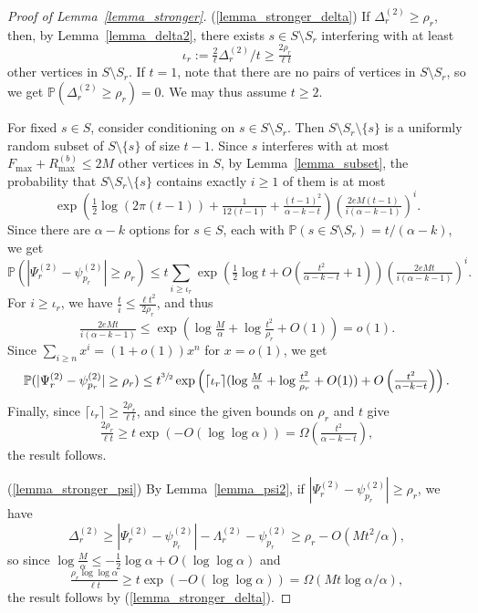 \documentclass{article}
\theoremstyle{plain}
\theoremstyle{remark}
\theoremstyle{plain}
\numberwithin{equation}{section}
\begin{document}
	\begin{proof}[Proof of Lemma~\ref{lemma_stronger}]
		(\ref{lemma_stronger_delta}) If $\Delta_r^{(2)}\geq\rho_r$, then, by Lemma~\ref{lemma_delta2}, there exists $s\in S\setminus S_r$ interfering with at least $$\iota_r:=\tfrac{2}{\ell}\Delta_r^{(2)}/t\geq\tfrac{2\rho_r}{\ell t}$$ other vertices in $S\setminus S_r$. If $t=1$, note that there are no pairs of vertices in $S\setminus S_r$, so we get $\mathbb{P}(\Delta_r^{(2)}\geq\rho_r)=0$. We may thus assume $t\geq2$.
		
		For fixed $s\in S$, consider conditioning on $s\in S\setminus S_r$. Then $S\setminus S_r\setminus\{s\}$ is a uniformly random subset of $S\setminus\{s\}$ of size $t-1$. Since $s$ interferes with at most $F_{\max}+R_{\max}^{(b)}\leq2M$ other vertices in $S$, by Lemma~\ref{lemma_subset}, the probability that $S\setminus S_r\setminus\{s\}$ contains exactly $i\geq1$ of them is at most $$\exp\left(\tfrac12\log(2\pi(t-1))+\tfrac1{12(t-1)}+\tfrac{(t-1)^2}{\alpha-k-t}\right)\left(\tfrac{2eM(t-1)}{i(\alpha-k-1)}\right)^i.$$ Since there are $\alpha-k$ options for $s\in S$, each with $\mathbb{P}(s\in S\setminus S_r)=t/(\alpha-k)$, we get $$\mathbb{P}(|\Psi_r^{(2)}-\psi_{p_r}^{(2)}|\geq\rho_r)\leq t\sum_{i\geq\iota_r}\exp\left(\tfrac12\log t+O\left(\tfrac{t^2}{\alpha-k-t}+1\right)\right)\left(\tfrac{2eMt}{i(\alpha-k-1)}\right)^i.$$ For $i\geq\iota_r$, we have $\tfrac{t}{i}\leq\tfrac{\ell t^2}{2\rho_r}$, and thus $$\tfrac{2eMt}{i(\alpha-k-1)}\leq\exp\left(\log\tfrac{M}{\alpha}+\log\tfrac{t^2}{\rho_r}+O(1)\right)=o(1).$$ Since $\sum_{i\geq n}x^i=(1+o(1))x^n$ for $x=o(1)$, we get $$\mathbb{P}(|\Psi_r^{(2)}-\psi_{p_r}^{(2)}|\geq\rho_r)\leq t^{\sfrac32}\exp\left(\lceil\iota_r\rceil(\log\tfrac{M}{\alpha}+\log\tfrac{t^2}{\rho_r}+O(1))+O\left(\tfrac{t^2}{\alpha-k-t}\right)\right).$$ Finally, since $\lceil\iota_r\rceil\geq\tfrac{2\rho_r}{\ell t}$, and since the given bounds on $\rho_r$ and $t$ give $$\tfrac{2\rho_r}{\ell t}\geq t\exp(-O(\log\log\alpha))=\Omega\left(\tfrac{t^2}{\alpha-k-t}\right),$$ the result follows.
		
		(\ref{lemma_stronger_psi}) By Lemma~\ref{lemma_psi2}, if $|\Psi_r^{(2)}-\psi_{p_r}^{(2)}|\geq\rho_r$, we have $$\Delta_r^{(2)}\geq|\Psi_r^{(2)}-\psi_{p_r}^{(2)}|-\Lambda_r^{(2)}-\psi_{p_r}^{(2)}\geq\rho_r-O(Mt^2/\alpha),$$ so since $\log\tfrac{M}{\alpha}\leq-\tfrac12\log\alpha+O(\log\log\alpha)$ and $$\tfrac{\rho_r\log\log\alpha}{\ell t}\geq t\exp(-O(\log\log\alpha))=\Omega(Mt\log\alpha/\alpha),$$ the result follows by (\ref{lemma_stronger_delta}).
	\end{proof}
	
\end{document}
